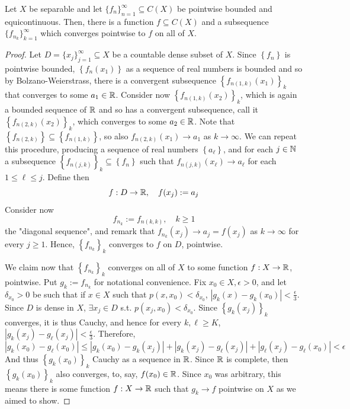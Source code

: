 \begin{lem}
    Let $X$ be separable and let $\{f_{n}\}_{n=1}^{\infty} \subseteq C(X)$
    be pointwise bounded and equicontinuous. Then, there is a function $f \subseteq C(X)$ 
    and a subsequence $\{f_{n_k}\}_{k=1}^{\infty} $ which converges pointwise to $f$ on all of $X$.  
\end{lem}

\begin{proof}
    Let $D = \{x_{j}\}_{j=1}^{\infty} \subseteq X$ be a countable dense subset of $X$. Since
    $\left\{ f_n \right\} $ is pointwise bounded, $\left\{ f_n(x_1) \right\} $ as a sequence of 
    real numbers is bounded and so by Bolzano-Weierstrass, there is a convergent 
    subsequence $\left\{ f_{n(1, k)}(x_1) \right\}_k $ that converges to some $a_1 \in \mathbb{R}$.
    Consider now $\left\{ f_{n(1, k)}(x_2) \right\}_k$, which is again a bounded sequence of $\mathbb{R}$
    and so has a convergent subsequence, call it $\left\{ f_{n(2, k)}(x_2) \right\}_k$, which
    converges to some $a_2 \in \mathbb{R}$. Note that
    $\left\{ f_{n(2, k)} \right\} \subseteq \left\{ f_{n(1, k)} \right\} $, so also 
    $f_{n(2, k)}(x_1) \to a_1$ as $k \to \infty$. We can repeat this procedure, producing
    a sequence of real numbers $\left\{ a_\ell \right\} $, and for each $j \in \mathbb{N}$
    a subsequence $\left\{ f_{n(j, k)}\right\}_k \subseteq \left\{ f_n \right\} $ such that
    $f_{n(j, k)}(x_\ell) \to a_\ell$ for each $1 \leq \ell \leq j$. Define then
    \[
    f : D \to \mathbb{R}, \quad f(x_j) := a_j
    \] 
    Consider now
    \[
    f_{n_k} := f_{n(k, k)}, \quad k \geq 1
    \]
    the "diagonal sequence", and remark that $f_{n_k}(x_j) \to a_j = f(x_j)$ as $k \to \infty$
    for every $j \geq 1$. Hence, $\left\{ f_{n_k} \right\}_k$ converges to $f$ on $D$, pointwise.
    
    We claim now that $\left\{ f_{n_k} \right\}_k$ converges on all of $X$ to some function
    $f : X \to \mathbb{R}$, pointwise. Put $g_k := f_{n_k}$ for notational convenience. Fix $x_0 \in X,
    \epsilon > 0$, and let $\delta_{x_0} > 0$ be such that if 
    $x \in X$ such that $p(x, x_0) < \delta_{x_0}$,
    $\left| g_k(x) - g_k(x_0) \right| < \frac{\epsilon}{3}$. Since $D$ is dense in $X$, 
    $\exists x_j \in D$ s.t. $p(x_j, x_0) < \delta_{x_0}$. Since $\left\{ g_k(x_j) \right\}_k$ 
    converges, it is thus Cauchy, and hence for every 
    $k, \ell \geq K$, $\left| g_k(x_j) - g_\ell(x_j) \right| < \frac{\epsilon}{3}$. Therefore,
    \[
        \left| g_k(x_0) - g_\ell(x_0) \right| \leq 
        \left| g_k(x_0) - g_k(x_j) \right| + \left| g_k(x_j) - g_\ell(x_j) \right| + 
        \left| g_\ell(x_j) - g_\ell(x_0) \right| < \epsilon 
    \]  
    And thus $\left\{ g_k(x_0) \right\}_{k}  $ Cauchy as a sequence in $\mathbb{R}$. Since $\mathbb{R}$ is complete,
    then $\left\{ g_k(x_0) \right\}_{k}$ also converges, to, say, $f(x_0) \in \mathbb{R}$. Since $x_0$ was
    arbitrary, this means there is some function $f : X \to \mathbb{R}$ such that $g_k \to f$ pointwise
    on $X$ as we aimed to show.    
\end{proof}

